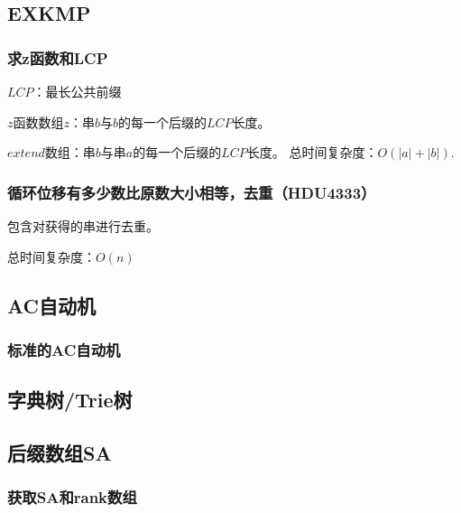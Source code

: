 \documentclass{article}
\begin{document}
\subsection{EXKMP}
\subsubsection{求z函数和LCP}
$LCP$：最长公共前缀\par
$z$函数数组$z$：串$b$与$b$的每一个后缀的$LCP$长度。\par
$extend$数组：串$b$与串$a$的每一个后缀的$LCP$长度。
总时间复杂度：$O(|a|+|b|)$.

\subsubsection{循环位移有多少数比原数大小相等，去重（HDU4333）}
包含对获得的串进行去重。\par
总时间复杂度：$O(n)$



\subsection{AC自动机}
\subsubsection{标准的AC自动机}


\subsection{字典树/Trie树}


% 

% 


\subsection{后缀数组SA}
\subsubsection{获取SA和rank数组}

\end{document}
